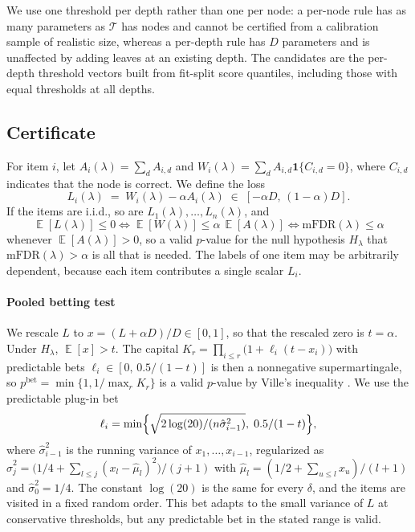 \documentclass[preprint,12pt]{elsarticle}
\theoremstyle{definition}
\newcommand{\fdr}{\mathrm{mFDR}}
\DeclareMathOperator{\E}{\mathbb{E}}
\begin{document}
We use one threshold per depth rather than one per node: a per-node rule has as
many parameters as $\mathcal{T}$ has nodes and cannot be certified from a
calibration sample of realistic size, whereas a per-depth rule has $D$
parameters and is unaffected by adding leaves at an existing depth. The
candidates are the per-depth threshold vectors built from fit-split score
quantiles, including those with equal thresholds at all depths.

\subsection{Certificate}
\label{sec:method-cert}

For item $i$, let $A_i(\lambda)=\sum_d A_{i,d}$ and
$W_i(\lambda)=\sum_d A_{i,d}\mathbf{1}\{C_{i,d}=0\}$, where $C_{i,d}$ indicates
that the node is correct. We define the loss
\begin{equation}
  L_i(\lambda) \;=\; W_i(\lambda)-\alpha A_i(\lambda)\;\in\;[-\alpha D,\,(1-\alpha)D].
  \label{eq:loss}
\end{equation}
If the items are i.i.d., so are $L_1(\lambda),\dots,L_n(\lambda)$, and
\begin{equation}
  \E[L(\lambda)]\le 0 \iff \E[W(\lambda)]\le\alpha\,\E[A(\lambda)]
  \iff \fdr(\lambda)\le\alpha
  \label{eq:equiv}
\end{equation}
whenever $\E[A(\lambda)]>0$, so a valid $p$-value for the null hypothesis
$H_\lambda$ that $\fdr(\lambda)>\alpha$ is all that is needed. The labels of one
item may be arbitrarily dependent, because each item contributes a single
scalar $L_i$.

\paragraph{Pooled betting test}
We rescale $L$ to $x=(L+\alpha D)/D\in[0,1]$, so that the rescaled zero is
$t=\alpha$. Under
$H_\lambda$, $\E[x]>t$. The capital
$K_r=\prod_{i\le r}\bigl(1+\ell_i(t-x_i)\bigr)$ with predictable bets
$\ell_i\in[0,\,0.5/(1-t)]$ is then a nonnegative supermartingale, so
$p^{\mathrm{bet}}=\min\{1,1/\max_r K_r\}$ is a valid $p$-value by Ville's inequality
\citep{waudbysmith2024estimating}. We use the predictable plug-in bet
\begin{equation}
  \ell_i=\min\Bigl\{\sqrt{2\log(20)/(n\hat\sigma^2_{i-1})},\;0.5/(1-t)\Bigr\},
  \label{eq:bet}
\end{equation}
where $\hat\sigma^2_{i-1}$ is the running variance of $x_1,\dots,x_{i-1}$,
regularized as $\hat\sigma^2_{j}=\bigl(1/4+\sum_{l\le j}(x_l-\hat\mu_l)^2\bigr)/(j+1)$
with $\hat\mu_l=(1/2+\sum_{u\le l}x_u)/(l+1)$ and $\hat\sigma^2_0=1/4$. The
constant $\log(20)$ is the same for every $\delta$, and the items are visited
in a fixed random order. This bet adapts to the small variance of $L$ at
conservative thresholds, but any predictable bet in the stated range is valid.
\end{document}

